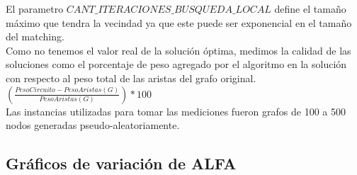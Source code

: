 \documentclass[11pt, a4paper, spanish]{article}
\begin{document}
\noindent El parametro $CANT\_ITERACIONES\_BUSQUEDA\_LOCAL$ define el tama\~{n}o m\'aximo que tendra la vecindad ya que este puede ser exponencial en el tama\~{n}o del matching.\\


Como no tenemos el valor real de la soluci\'on \'optima, medimos la calidad de las soluciones como el porcentaje de peso agregado por el algoritmo en la soluci\'on con respecto al peso total de las aristas del grafo original. $\left(\frac{PesoCircuito - PesoAristas(G)}{PesoAristas(G)}\right)*100$\\
Las instancias utilizadas para tomar las mediciones fueron grafos de 100 a 500 nodos generadas pseudo-aleatoriamente.\\

\newpage
\subsection{Gr\'aficos de variaci\'on de ALFA}
\end{document}
